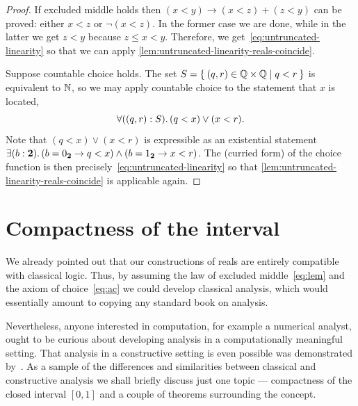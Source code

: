 \begin{proof}
  If excluded middle holds then $(x < y) \to (x < z) + (z < y)$ can be proved: either $x <
  z$ or $\lnot (x < z)$. In the former case we are done, while in the latter we get $z <
  y$ because $z \leq x < y$. Therefore, we get~\eqref{eq:untruncated-linearity} so that we
  can apply \cref{lem:untruncated-linearity-reals-coincide}.

  Suppose countable choice holds. The set $S = \setof{ \pairr{q, r} \in \Q \times \Q | q <
    r }$ is equivalent to $\mathbb{N}$, so we may apply countable choice to the statement that $x$
  is located,
  \begin{equation*}
    \fall{\pairr{q, r} : S} (q < x) \lor (x < r).
  \end{equation*}
  Note that $(q < x) \lor (x < r)$ is expressible as an existential statement $\exis{b :
    \bool} (b = \bfalse \to q < x) \land (b = \btrue \to x < r)$. The (curried form) of
  the choice function is then precisely~\eqref{eq:untruncated-linearity} so that
  \cref{lem:untruncated-linearity-reals-coincide} is applicable again.
\end{proof}

%
%
%


\section{Compactness of the interval}
\label{sec:compactness-interval}

%
%

We already pointed out that our constructions of reals are entirely compatible with
classical logic. Thus, by assuming the law of excluded middle~\eqref{eq:lem} and the axiom
of choice~\eqref{eq:ac} we could develop classical analysis, which would essentially
amount to copying any standard book on analysis.

%
%
Nevertheless, anyone interested in computation, for example a numerical analyst, ought to
be curious about developing analysis in a computationally meaningful setting. That
analysis in a constructive setting is even possible was demonstrated by~\cite{Bishop1967}.
As a sample of the differences and similarities between classical and constructive
analysis we shall briefly discuss just one topic --- compactness of the closed interval
$[0,1]$ and a couple of theorems surrounding the concept.

